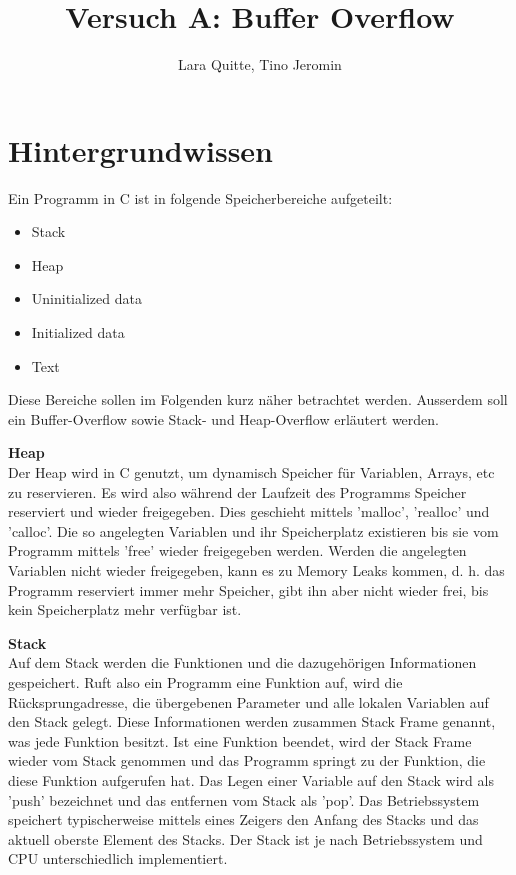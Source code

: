 \documentclass[12pt,a4paper]{article}
\date{}
\author{Lara Quitte, Tino Jeromin}
\title{Versuch A: Buffer Overflow}
\begin{document}
\maketitle


\section*{Hintergrundwissen}
Ein Programm in C ist in folgende Speicherbereiche aufgeteilt:
\begin{itemize}
\item Stack
\item Heap
\item Uninitialized data
\item Initialized data 
\item Text
\end{itemize}

Diese Bereiche sollen im Folgenden kurz näher betrachtet werden. Ausserdem soll ein Buffer-Overflow sowie Stack- und Heap-Overflow erläutert werden.
\bigskip

\textbf{Heap} \\
Der Heap wird in C genutzt, um dynamisch Speicher für Variablen, Arrays, etc zu reservieren.
Es wird also während der Laufzeit des Programms Speicher reserviert und wieder freigegeben.
Dies geschieht mittels 'malloc', 'realloc' und 'calloc'. 
Die so angelegten Variablen und ihr Speicherplatz existieren bis sie vom Programm mittels 'free' wieder
freigegeben werden. Werden die angelegten Variablen nicht wieder freigegeben, kann es zu Memory Leaks
kommen, d. h. das Programm reserviert immer mehr Speicher, gibt ihn aber nicht wieder frei, bis kein 
Speicherplatz mehr verfügbar ist.
\bigskip

\textbf{Stack} \\
Auf dem Stack werden die Funktionen und die dazugehörigen Informationen gespeichert.
Ruft also ein Programm eine Funktion auf, wird die Rücksprungadresse, die übergebenen Parameter und 
alle lokalen Variablen auf den Stack gelegt. Diese Informationen werden zusammen Stack Frame genannt, 
was jede Funktion besitzt.
Ist eine Funktion beendet, wird der Stack Frame wieder vom Stack genommen und das Programm springt 
zu der Funktion, die diese Funktion aufgerufen hat.
Das Legen einer Variable auf den Stack wird als 'push' bezeichnet und das entfernen vom Stack als 'pop'.
Das Betriebssystem speichert typischerweise mittels eines Zeigers den Anfang des Stacks und das aktuell 
oberste Element des Stacks.
Der Stack ist je nach Betriebssystem und CPU unterschiedlich implementiert.
\bigskip
\end{document}
